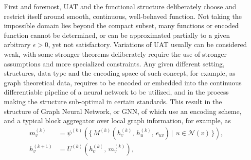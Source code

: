 First and foremost, UAT and the functional structure deliberately choose and restrict itself around smooth, continuous, well-behaved function. Not taking the impossible domain lies beyond the compact subset, many functions or encoded function cannot be determined, or can be approximated partially to a given arbitrary $\epsilon>0$, yet not satisfactory. Variations of UAT usually can be considered weak, with some stronger theorems deliberately require the use of stronger assumptions and more specialized constraints.  Any given different setting, structures, data type and the encoding space of such concept, for example, as graph theoretical data, requires to be encoded or embedded into the continuous differentiable pipeline of a neural network to be utilized, and in the process making the structure sub-optimal in certain standards. This result in the structure of Graph Neural Network, or GNN, of which use an encoding scheme, and a typical block aggregator over local graph information, for example, as 
\begin{equation}
\begin{aligned}
m_v^{(k)} &= \psi^{(k)}\!\left(\{\, M^{(k)}(h_v^{(k)},\, h_u^{(k)},\, e_{uv}) \mid u \in \mathcal{N}(v)\,\}\right), \\[4pt]
h_v^{(k+1)} &= U^{(k)}\!\left(h_v^{(k)},\, m_v^{(k)}\right),
\end{aligned}
\end{equation}
